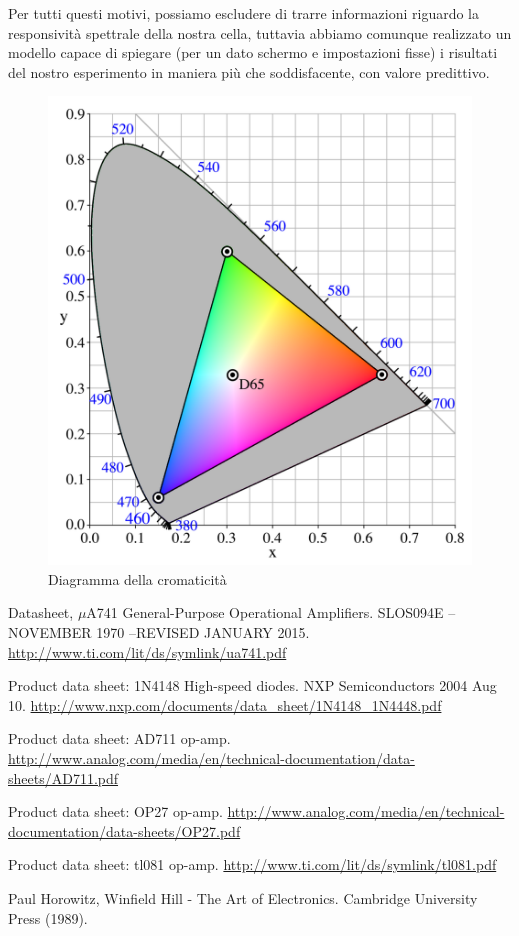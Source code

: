 \documentclass[journal, a4paper]{IEEEtran}
\begin{document}
Per tutti questi motivi, possiamo escludere di trarre informazioni riguardo la responsività spettrale della nostra cella, tuttavia abbiamo comunque realizzato un modello capace di spiegare (per un dato schermo e impostazioni fisse) i risultati del nostro esperimento in maniera più che soddisfacente, con valore predittivo.

\begin{figure}
\centering
\includegraphics[width=0.8\linewidth]{./relaz_colori/8_CIExy1931_sRGB_gamut_D65}
\caption{Diagramma della cromaticità}
\label{fig:8_CIExy1931_sRGB_gamut_D65}
\end{figure}



\begin{thebibliography}{5}

	Datasheet, $\mu $A741 General-Purpose Operational Amplifiers. SLOS094E – NOVEMBER 1970  –REVISED JANUARY 2015.
	\url{http://www.ti.com/lit/ds/symlink/ua741.pdf}

	Product data sheet: 1N4148 High-speed diodes. NXP Semiconductors 2004 Aug 10.
	\url{http://www.nxp.com/documents/data_sheet/1N4148_1N4448.pdf}

	Product data sheet: AD711 op-amp.
	\url{http://www.analog.com/media/en/technical-documentation/data-sheets/AD711.pdf}
	
	Product data sheet: OP27 op-amp.
	\url{http://www.analog.com/media/en/technical-documentation/data-sheets/OP27.pdf}
	
	Product data sheet: tl081 op-amp.
	\url{http://www.ti.com/lit/ds/symlink/tl081.pdf}

	Paul Horowitz, Winfield Hill - The Art of Electronics. Cambridge University Press (1989).
	
\end{thebibliography}
\end{document}
